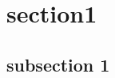 \documentclass[10pt,a4j,openany,dvipdfmx]{jsarticle}
\begin{document}

\section{section1} %
\label{sec:section1}

\subsection{subsection 1} %
\label{sub:subsection_1}




\end{document}
